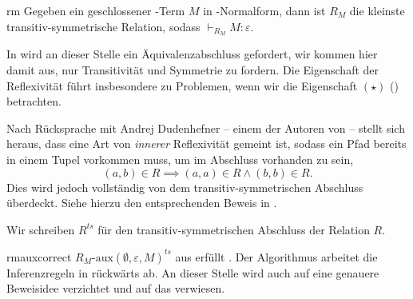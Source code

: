 \begin{definition}{}{rm}
    Gegeben ein geschlossener \tlambda-Term $M$ in \tbeta-Normalform, dann ist $R_M$ die kleinste transitiv-symmetrische Relation, sodass $\vdash_{R_M} M : \varepsilon$.
\end{definition}
\begin{remark}
    In \cite{dudenhefner} wird an dieser Stelle ein Äquivalenzabschluss gefordert, wir kommen hier damit aus, nur Transitivität und Symmetrie zu fordern. Die Eigenschaft der Reflexivität führt insbesondere zu Problemen, wenn wir die Eigenschaft $(\star)$ () betrachten.
    
    Nach Rücksprache mit Andrej Dudenhefner -- einem der Autoren von \cite{dudenhefner} -- stellt sich heraus, dass eine Art von \emph{innerer} Reflexivität gemeint ist, sodass ein Pfad bereits in einem Tupel vorkommen muss, um im Abschluss vorhanden zu sein,
    \[(a,b)\in R \implies (a,a)\in R \land (b,b)\in R.\]
    Dies wird jedoch vollständig von dem transitiv-symmetrischen Abschluss überdeckt. Siehe hierzu den entsprechenden Beweis in .
\end{remark}
\begin{notation}
    Wir schreiben $R^{ts}$ für den transitiv-symmetrischen Abschluss der Relation $R$.
\end{notation}
\begin{lemma}{}{rmauxcorrect}
    $R_M\text{-aux}(\emptyset, \varepsilon, M)^{ts}$ aus  erfüllt .
    \Proofidea
    Der Algorithmus arbeitet die Inferenzregeln in  rückwärts ab. An dieser Stelle wird auch auf eine genauere Beweisidee verzichtet und auf das  verwiesen.
\end{lemma}
\newcommand{\RMaux}{\ensuremath{R_M\text{-aux}}}
